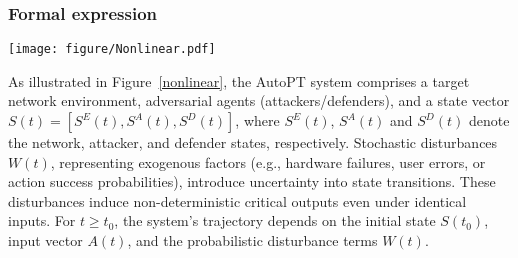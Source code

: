 \subsubsection{Formal expression}

\begin{figure*}[tb]
    \centering
    \texttt{[image: figure/Nonlinear.pdf]}
    \caption{The Dynamic Nonlinear System Framework of AutoPT Simulation Modeling}
    \label{nonlinear}
\end{figure*}

% 

As illustrated in Figure~\ref{nonlinear}, the AutoPT system comprises a target network environment, adversarial agents (attackers/defenders), and a state vector $S(t) = [S^E(t), S^A(t), S^D(t)]$, where $S^E(t)$, $S^A(t)$ and $S^D(t)$ denote the network, attacker, and defender states, respectively.
Stochastic disturbances $W(t)$, representing exogenous factors (e.g., hardware failures, user errors, or action success probabilities), introduce uncertainty into state transitions. These disturbances induce non-deterministic critical outputs even under identical inputs. For $t \geq t_0$, the system’s trajectory depends on the initial state $S(t_0)$, input vector $A(t)$, and the probabilistic disturbance terms $W(t)$.
 
